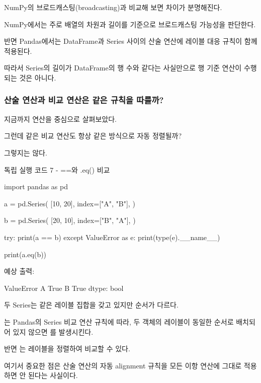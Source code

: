 NumPy의 브로드캐스팅(broadcasting)과 비교해 보면 차이가 분명해진다.

NumPy에서는 주로 배열의 차원과 길이를 기준으로 브로드캐스팅 가능성을 판단한다.

반면 Pandas에서는 DataFrame과 Series 사이의 산술 연산에 레이블 대응 규칙이 함께 적용된다.

따라서 Series의 길이가 DataFrame의 행 수와 같다는 사실만으로 행 기준 연산이 수행되는 것은 아니다.

\subsubsection{산술 연산과 비교 연산은 같은 규칙을 따를까?}

지금까지 \zsh{+} 연산을 중심으로 살펴보았다.

그런데 \zsh{==} 같은 비교 연산도 항상 같은 방식으로 자동 정렬될까?

그렇지는 않다.

\begin{dhknote}
\begin{dhksmry}[centered]
독립 실행 코드 7 - ==와 .eq() 비교
\end{dhksmry}
\end{dhknote}

\begin{dhkcode}
import pandas as pd

a = pd.Series(
    [10, 20],
    index=["A", "B"],
)

b = pd.Series(
    [20, 10],
    index=["B", "A"],
)

try:
    print(a == b)
except ValueError as e:
    print(type(e).__name__)

print(a.eq(b))
\end{dhkcode}

예상 출력:

\begin{dhkzsh}
ValueError
A    True
B    True
dtype: bool
\end{dhkzsh}

두 Series는 같은 레이블 집합을 갖고 있지만 순서가 다르다.

는 Pandas의 Series 비교 연산 규칙에 따라, 두 객체의 레이블이 동일한 순서로 배치되어 있지 않으면 를 발생시킨다.

반면 는 레이블을 정렬하여 비교할 수 있다.

여기서 중요한 점은 산술 연산의 자동 alignment 규칙을 모든 이항 연산에 그대로 적용하면 안 된다는 사실이다.

